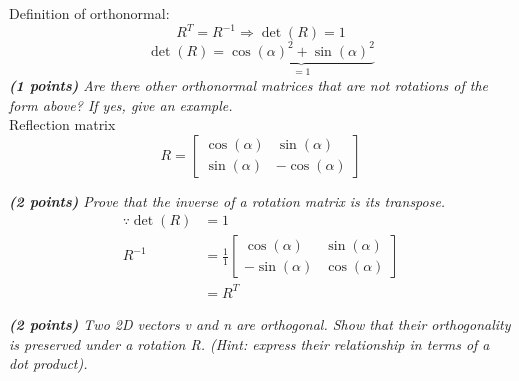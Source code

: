 \documentclass[a4paper,10pt]{article}
\begin{document}
Definition of orthonormal:
\[R^T=R^{-1}\Rightarrow\det(R)=1\]
\[\det(R)=\underbrace{\cos(\alpha)^2+\sin(\alpha)^2}_{=1}\]
\textit{\textbf{(1 points)} Are there other orthonormal matrices that are not rotations of the form above? If yes, give an example.}\\

Reflection matrix
\[R=\begin{bmatrix}
\cos(\alpha)&\sin(\alpha)\\ 
\sin(\alpha)&-\cos(\alpha)
\end{bmatrix}\]

\textit{\textbf{(2 points)} Prove that the inverse of a rotation matrix is its transpose.}\\

\[\begin{aligned}
\because \det(R)&=1\\
R^{-1}&=\frac{1}{1}\begin{bmatrix}
\cos(\alpha)&\sin(\alpha)\\ 
-\sin(\alpha)&\cos(\alpha)
\end{bmatrix}\\
&=R^T
\end{aligned}\]


\textit{\textbf{(2 points)} Two 2D vectors v and n are orthogonal. Show that their orthogonality is preserved under a rotation R. (Hint: express their relationship in terms of a dot product).}\\
\end{document}
